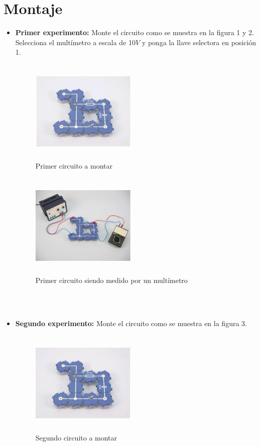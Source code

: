 \section{Montaje}
\begin{itemize}
	\renewcommand{\theenumi}{\Alph{enumi}}
	\item \textbf{ Primer experimento:} Monte el circuito como se muestra en la figura 1 y 2. Selecciona el multímetro a escala de 10$V$ y ponga la llave selectora en posición 1.
	\begin{figure}[h]
		\centering
		\includegraphics[width=5cm, height= 5cm]{imagenes/figura1}
		\caption{Primer circuito a montar}
	\end{figure}
	\begin{figure}[h]
		\centering
		\includegraphics[width=5cm, height=5cm]{imagenes/figura2}
		\caption{Primer circuito siendo medido por un multímetro}
	\end{figure}
	\\
	\\
	\item \textbf{Segundo experimento:} Monte el circuito como se muestra  en la figura 3.
	\begin{figure}[h]
		\centering
		\includegraphics[width=5cm, height=5cm]{imagenes/figura3}
		\caption{Segundo circuito a montar}
	\end{figure}
\end{itemize}

